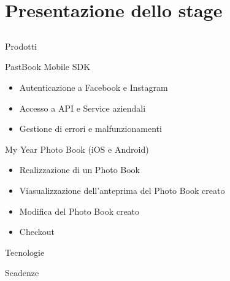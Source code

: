 \section{Presentazione dello stage}
	\subsection{}
		\begin{frame}{Prodotti}
			\begin{block}{PastBook Mobile SDK}
				\begin{itemize}
					\item Autenticazione a Facebook e Instagram
					\item Accesso a API e Service aziendali
					\item Gestione di errori e malfunzionamenti
				\end{itemize}
			\end{block}
			\begin{block}{My Year Photo Book (iOS e Android)}
				\begin{itemize}
					\item Realizzazione di un Photo Book
					\item Viasualizzazione dell'anteprima del Photo Book creato
					\item Modifica del Photo Book creato
					\item Checkout
				\end{itemize}
			\end{block}
		\end{frame}
		\begin{frame}{Tecnologie}
		\end{frame}
		\begin{frame}{Scadenze}
		\end{frame}
